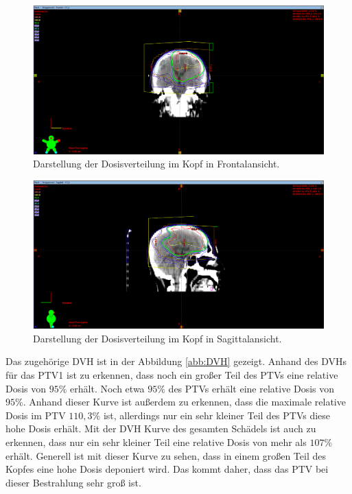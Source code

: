 \begin{figure}[H]
  \centering
  \includegraphics[width=\textwidth]{Bilder/Teilhirn1_Y.png}
  \caption{Darstellung der Dosisverteilung im Kopf in Frontalansicht.}
  \label{abb:Y}
\end{figure}

\begin{figure}[H]
  \centering
  \includegraphics[width=\textwidth]{Bilder/Teilhirn1_X.png}
  \caption{Darstellung der Dosisverteilung im Kopf in Sagittalansicht.}
  \label{abb:X}
\end{figure}

Das zugehörige DVH ist in der Abbildung \ref{abb:DVH} gezeigt. Anhand des DVHs für das PTV1 ist zu erkennen, dass noch ein großer Teil des PTVs
eine relative Dosis von $95\%$ erhält. Noch etwa $95\%$ des PTVs erhält eine relative Dosis von $95\%$. Anhand dieser Kurve ist außerdem
zu erkennen, dass die maximale relative Dosis im PTV $110,3\%$ ist, allerdings nur ein sehr kleiner Teil des PTVs diese hohe Dosis erhält.
Mit der DVH Kurve des gesamten Schädels ist auch zu erkennen, dass nur ein sehr kleiner Teil eine relative Dosis von mehr als $107\%$ erhält.
Generell ist mit dieser Kurve zu sehen, dass in einem großen Teil des Kopfes eine hohe Dosis deponiert wird. Das kommt daher, dass das PTV bei dieser
Bestrahlung sehr groß ist.


